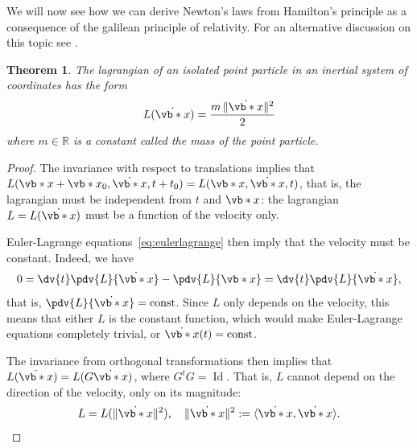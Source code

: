 \documentclass[english,fontsize=11pt,paper=b5]{scrbook}
\DeclareMathOperator{\Id}{Id}
\DeclareMathOperator{\Id}{Id}
\newtheorem{theorem}{Theorem}[chapter]
\theoremstyle{definition}
\begin{document}
    We will now see how we can derive Newton's laws from Hamilton's principle as a consequence of the galilean principle of relativity. For an alternative discussion on this topic see \cite[Chapters 1.1 and 1.2]{book:arnold}.

    \begin{theorem}
      The lagrangian of an isolated point particle in an inertial system of coordinates has the form
      \begin{equation}\label{eq:singleptlag}
        L(\dot{\vb*{x}}) = \frac{m\,\|\dot{\vb*{x}}\|^2}2
      \end{equation}
      where $m\in\mathbb{R}$ is a constant called the \emph{mass} of the point particle.
    \end{theorem}
    \begin{proof}
      The invariance with respect to translations implies that $L(\vb*{x} + \vb*{x}_0, \dot{\vb*{x}}, t + t_0) = L(\vb*{x}, \dot{\vb*{x}}, t)$, that is, the lagrangian must be independent from $t$ and $\vb*{x}$: the lagrangian $L = L(\dot{\vb*{x}})$ must be a function of the velocity only.

      Euler-Lagrange equations~\eqref{eq:eulerlagrange} then imply that the velocity must be constant. Indeed, we have
      \begin{equation}
      0 = \dv{t}\pdv{L}{\dot{\vb*{x}}} - \pdv{L}{\vb*{x}} = \dv{t}\pdv{L}{\dot{\vb*{x}}},
      \end{equation}
      that is, $\pdv{L}{\dot{\vb*{x}}} = \mathrm{const}$. Since $L$ only depends on the velocity, this means that either $L$ is the constant function, which would make Euler-Lagrange equations completely trivial, or $\dot{\vb*{x}}(t) = \mathrm{const}$.

      The invariance from orthogonal transformations then implies that $L(\dot{\vb*{x}}) = L(G\dot{\vb*{x}})$, where $G^t G = \Id$. That is, $L$ cannot depend on the direction of the velocity, only on its magnitude:
      \begin{equation}
        L = L(\|\dot{\vb*{x}}\|^2), \quad \|\dot{\vb*{x}}\|^2 := \langle\dot{\vb*{x}}, \dot{\vb*{x}}\rangle.
      \end{equation}


\end{proof}
\end{document}
